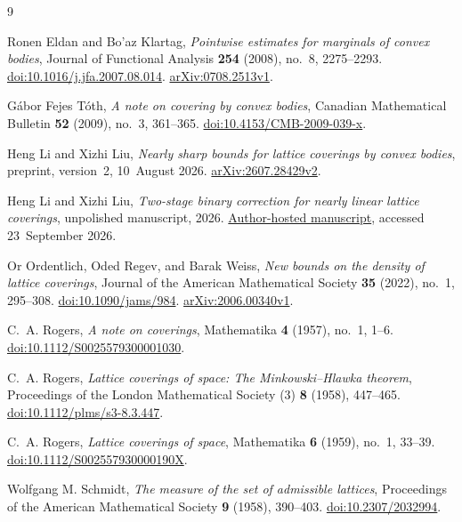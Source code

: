 \begingroup
\small
\raggedright
{}
\begin{thebibliography}{9}

Ronen Eldan and Bo'az Klartag,
\emph{Pointwise estimates for marginals of convex bodies},
Journal of Functional Analysis \textbf{254} (2008), no.~8, 2275--2293.
\href{https://doi.org/10.1016/j.jfa.2007.08.014}{doi:10.1016/j.jfa.2007.08.014}.
\href{https://arxiv.org/abs/0708.2513v1}{arXiv:0708.2513v1}.

G\'abor Fejes T\'oth,
\emph{A note on covering by convex bodies},
Canadian Mathematical Bulletin \textbf{52} (2009), no.~3, 361--365.
\href{https://doi.org/10.4153/CMB-2009-039-x}{doi:10.4153/CMB-2009-039-x}.

Heng Li and Xizhi Liu,
\emph{Nearly sharp bounds for lattice coverings by convex bodies},
preprint, version~2, 10~August 2026.
\href{https://arxiv.org/abs/2607.28429v2}{arXiv:2607.28429v2}.

Heng Li and Xizhi Liu,
\emph{Two-stage binary correction for nearly linear lattice coverings},
unpolished manuscript, 2026.
\href{https://github.com/xliu2022/xliu2022.github.io/blob/4b360838cb034784293bb6ba2128483fcec6e3ce/Unpolished_Manuscripts/Two-Stage\%20Binary\%20Correction\%20for\%20Nearly\%20Linear\%20Lattice\%20Coverings.pdf}{Author-hosted manuscript},
accessed 23~September 2026.

Or Ordentlich, Oded Regev, and Barak Weiss,
\emph{New bounds on the density of lattice coverings},
Journal of the American Mathematical Society \textbf{35} (2022), no.~1,
295--308.
\href{https://doi.org/10.1090/jams/984}{doi:10.1090/jams/984}.
\href{https://arxiv.org/abs/2006.00340v1}{arXiv:2006.00340v1}.

C.~A. Rogers,
\emph{A note on coverings},
Mathematika \textbf{4} (1957), no.~1, 1--6.
\href{https://doi.org/10.1112/S0025579300001030}{doi:10.1112/S0025579300001030}.


C.~A. Rogers,
\emph{Lattice coverings of space: The Minkowski--Hlawka theorem},
Proceedings of the London Mathematical Society (3) \textbf{8} (1958),
447--465.
\href{https://doi.org/10.1112/plms/s3-8.3.447}{doi:10.1112/plms/s3-8.3.447}.

C.~A. Rogers,
\emph{Lattice coverings of space},
Mathematika \textbf{6} (1959), no.~1, 33--39.
\href{https://doi.org/10.1112/S002557930000190X}{doi:10.1112/S002557930000190X}.

Wolfgang M. Schmidt,
\emph{The measure of the set of admissible lattices},
Proceedings of the American Mathematical Society \textbf{9} (1958),
390--403.
\href{https://doi.org/10.2307/2032994}{doi:10.2307/2032994}.
\end{thebibliography}
\endgroup
